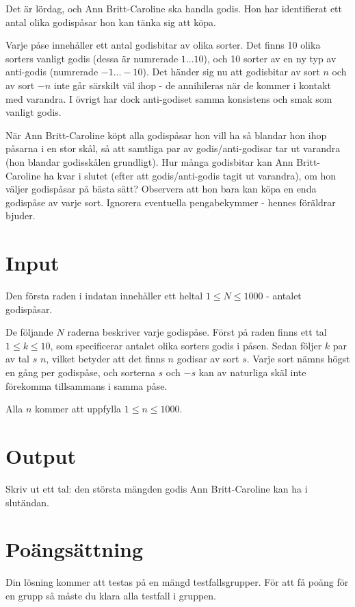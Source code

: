 
Det är lördag, och Ann Britt-Caroline ska handla godis. Hon har identifierat ett antal olika godispåsar hon kan tänka sig att köpa.

Varje påse innehåller ett antal godisbitar av olika sorter. Det finns 10 olika sorters vanligt godis (dessa är numrerade $1...10$), och 10 sorter av en ny typ av anti-godis (numrerade $-1...-10$). Det händer sig nu att godisbitar av sort $n$ och av sort $-n$ inte går särskilt väl ihop - de annihileras när de kommer i kontakt med varandra. I övrigt har dock anti-godiset samma konsistens och smak som vanligt godis.

När Ann Britt-Caroline köpt alla godispåsar hon vill ha så blandar hon ihop påsarna i en stor skål, så att samtliga par av godis/anti-godisar tar ut varandra (hon blandar godisskålen grundligt). Hur många godisbitar kan Ann Britt-Caroline ha kvar i slutet (efter att godis/anti-godis tagit ut varandra), om hon väljer godispåsar på bästa sätt? Observera att hon bara kan köpa en enda godispåse av varje sort. Ignorera eventuella pengabekymmer - hennes föräldrar bjuder.

\section*{Input}

Den första raden i indatan innehåller ett heltal $1 \le N \le 1000$ - antalet godispåsar.

De följande $N$ raderna beskriver varje godispåse.
Först på raden finns ett tal $1 \le k \le 10$, som specificerar antalet olika sorters godis i påsen.
Sedan följer $k$ par av tal $s$ $n$, vilket betyder att det finns $n$ godisar av sort $s$.
Varje sort nämns högst en gång per godispåse, och sorterna $s$ och $-s$ kan av naturliga skäl inte förekomma tillsammans i samma påse.

Alla $n$ kommer att uppfylla $1 \le n \le 1000$.

\section*{Output}

Skriv ut ett tal: den största mängden godis Ann Britt-Caroline kan ha i slutändan.


\section*{Poängsättning}
Din lösning kommer att testas på en mängd testfallsgrupper. För att få poäng för en grupp så måste du klara alla testfall i gruppen.

